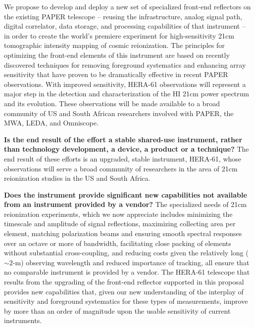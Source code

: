 \documentclass[preprint]{aastex}
\begin{document}
We propose to develop and deploy a new set of specialized front-end reflectors on
the existing PAPER telescope -- reusing 
the infrastructure, analog signal path,
digital correlator, data storage, and processing capabilities of that instrument --
in order to create the world's premiere experiment for high-sensitivity
21cm tomographic intensity mapping of cosmic reionization.
The principles for optimizing the front-end elements of this instrument are 
based on recently discovered techniques for removing foreground systematics and enhancing
array sensitivity that have proven to be dramatically effective in recent PAPER observations.
With improved sensitivity, HERA-61 observations 
will represent a major step in the detection and characterization of the HI 21cm power spectrum and its evolution. 
These observations will be made available to a broad community of US and South African researchers
involved with PAPER, the MWA, LEDA, and Omniscope.

{\bf Is the end result of the effort a stable shared-use instrument, rather than technology development, a device, a product or a technique?}
The end result of these efforts is an upgraded, stable instrument, HERA-61, whose observations will serve a
broad community of researchers in the area of 21cm reionization studies in the US and South Africa.

{\bf Does the instrument provide significant new capabilities not available from an instrument provided by a vendor?}
The specialized needs of 21cm reionization experiments, which we now appreciate includes minimizing the timescale and
amplitude of signal reflections, maximizing collecting area per element, matching polarization beams and
ensuring smooth spectral responses over an octave or more of bandwidth,
facilitating close packing of elements without substantial cross-coupling, and reducing costs given the
relatively long ($\sim2$-m) observing wavelength and reduced importance of tracking, all ensure that no comparable
instrument is provided by a vendor.  The HERA-61 telescope that results from the upgrading of
the front-end reflector supported in this proposal provides new capabilities
that, given our new understanding of the interplay of sensitivity and foreground systematics for these
types of measurements, improve by more than an order of magnitude upon the usable sensitivity of
current instruments.
\end{document}
